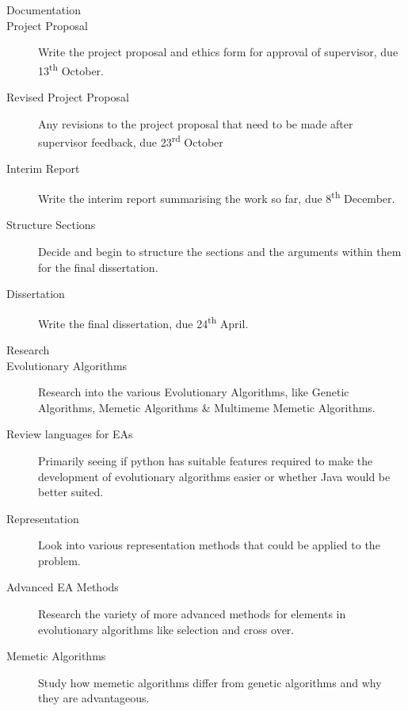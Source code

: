 \documentclass[a4paper]{article}
\begin{document}
\begin{description}
\item [\large{Documentation}]
\item [Project Proposal] Write the project proposal and ethics form for approval of supervisor, due 13\textsuperscript{th} October.
\item [Revised Project Proposal] Any revisions to the project proposal that need to be made after supervisor feedback, due 23\textsuperscript{rd} October
\item [Interim Report] Write the interim report summarising the work so far, due 8\textsuperscript{th} December.
\item [Structure Sections] Decide and begin to structure the sections and the arguments within them for the final dissertation.
\item [Dissertation] Write the final dissertation, due 24\textsuperscript{th} April.

\item [\large{Research}]
\item [Evolutionary Algorithms] Research into the various Evolutionary Algorithms, like Genetic Algorithms, Memetic Algorithms \& Multimeme Memetic Algorithms.
\item [Review languages for EAs] Primarily seeing if python has suitable features required to make the development of evolutionary algorithms easier or whether Java would be better suited.
\item [Representation] Look into various representation methods that could be applied to the problem.
\item [Advanced EA Methods] Research the variety of more advanced methods for elements in evolutionary algorithms like selection and cross over.
\item [Memetic Algorithms] Study how memetic algorithms differ from genetic algorithms and why they are advantageous.


\end{description}
\end{document}
